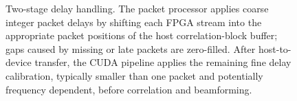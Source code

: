 \begin{figure}[!htbp]
  \caption{%
    Two-stage delay handling.  The packet processor applies coarse integer
    packet delays by shifting each FPGA stream into the appropriate packet
    positions of the host correlation-block buffer; gaps caused by missing or
    late packets are zero-filled.  After host-to-device transfer, the CUDA
    pipeline applies the remaining fine delay calibration, typically smaller
    than one packet and potentially frequency dependent, before correlation and
    beamforming.
  }
  \label{fig:delay-mechanism}
\end{figure}
